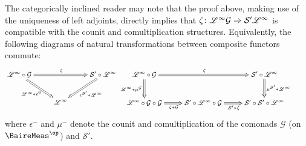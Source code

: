 \begin{remark}
	The categorically inclined reader may note that the proof above, making use of the uniqueness of left adjoints, directly implies that $\zeta\colon \mathscr{L}^{\infty} \mathcal{G}\Rightarrow \mathcal{S}'\mathscr{L}^{\infty}$ is compatible with the counit and comultiplication structures. Equivalently, the following diagrams of natural transformations between composite functors commute:
	\[\small
		\xymatrix{
		\Linf \circ\mathcal{G} \ar@{=>}[rr]^{\zeta} \ar@{=>}[dr]_{\Linf * \epsilon^{\mathcal{G}}} &&\mathcal{S}'\circ\Linf \ar@{=>}[dl]^{\epsilon^{\mathcal{S}'}* \Linf} \\
		& \Linf
		}%
		\xymatrix{
		\Linf \circ\mathcal{G} \ar@{=>}[rr]^{\zeta} \ar@{=>}[d]_{\Linf * \mu^{\mathcal{G}}}
		&& \mathcal{S}' \circ\Linf \ar@{=>}[d]^-{\mu^{\mathcal{S}'} * \Linf}
		& \\
		\Linf \circ\mathcal{G}\circ\mathcal{G} \ar@{=>}[r]_{\zeta *\mathcal{G}}
		& \mathcal{S}'\circ\Linf \circ\mathcal{G}\ar@{=>}[r]_{\mathcal{S}' *\zeta} & \mathcal{S}'\circ\mathcal{S}'\circ \Linf
		}
	\]
	where $\epsilon^{-} $ and $\mu^{-}$ denote the counit and comultiplication of the comonads $\mathcal{G}$ (on $\BaireMeas^{\op}$) and ${\mathcal{S}'}$.
\end{remark}


